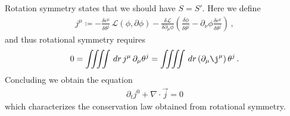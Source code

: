 \documentclass[11pt, onesided]{book}
\theoremstyle{break}
\theoremstyle{break}
\newcommand{\pd}{\partial}
\begin{document}
Rotation symmetry states that we should have $S = S'$. Here we define
\begin{align*}
j^\mu\coloneqq -\frac{\delta \epsilon^\mu}{\delta \theta^j}\,\mathcal{L}(\phi, \pd \phi) - \frac{\delta \mathcal{L}}{\delta \pd_\mu \phi}\left( \frac{\delta \phi}{\delta \theta^j}-\pd_\nu \phi \frac{\delta \epsilon^\mu}{\delta \theta^j} \right)\,,
\end{align*}
and thus rotational symmetry requires
\begin{align*}
0 = \iiiint \, dr\, j^\mu \,\pd_\mu\theta^j  =\iiiint \, dr\, (\pd_\mu \j^\mu) \, \theta^j \,. 
\end{align*}
Concluding we obtain the equation
\begin{align}
\pd_t j^0 + \nabla\cdot \vec{j} = 0
\end{align}
which characterizes the conservation law obtained from rotational symmetry.\\
\end{document}
